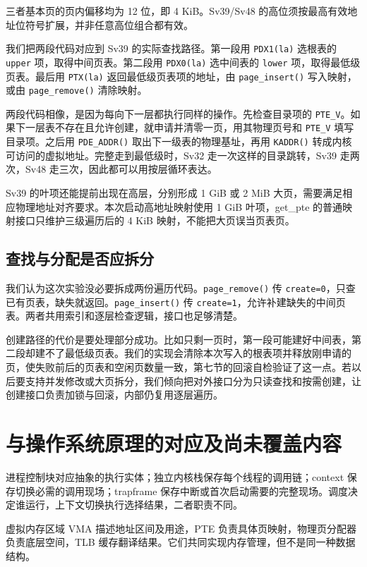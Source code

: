 \documentclass[UTF8,a4paper,10pt]{ctexart}
\begin{document}
三者基本页的页内偏移均为 12 位，即 4 KiB。Sv39/Sv48 的高位须按最高有效地址位符号扩展，并非任意高位组合都有效。


我们把两段代码对应到 Sv39 的实际查找路径。第一段用 \nolinkurl{PDX1(la)} 选根表的 \nolinkurl{upper} 项，取得中间页表。第二段用 \nolinkurl{PDX0(la)} 选中间表的 \nolinkurl{lower} 项，取得最低级页表。最后用 \nolinkurl{PTX(la)} 返回最低级页表项的地址，由 \nolinkurl{page_insert()} 写入映射，或由 \nolinkurl{page_remove()} 清除映射。


两段代码相像，是因为每向下一层都执行同样的操作。先检查目录项的 \nolinkurl{PTE_V}。如果下一层表不存在且允许创建，就申请并清零一页，用其物理页号和 \nolinkurl{PTE_V} 填写目录项。之后用 \nolinkurl{PDE_ADDR()} 取出下一级表的物理基址，再用 \nolinkurl{KADDR()} 转成内核可访问的虚拟地址。完整走到最低级时，Sv32 走一次这样的目录跳转，Sv39 走两次，Sv48 走三次，因此都可以用按层循环表达。


Sv39 的叶项还能提前出现在高层，分别形成 1 GiB 或 2 MiB 大页，需要满足相应物理地址对齐要求。本次启动高地址映射使用 1 GiB 叶项，get\_pte 的普通映射接口只维护三级遍历后的 4 KiB 映射，不能把大页误当页表页。


\subsection{查找与分配是否应拆分}

我们认为这次实验没必要拆成两份遍历代码。\nolinkurl{page_remove()} 传 \nolinkurl{create=0}，只查已有页表，缺失就返回。\nolinkurl{page_insert()} 传 \nolinkurl{create=1}，允许补建缺失的中间页表。两者共用索引和逐层检查逻辑，接口也足够清楚。


创建路径的代价是要处理部分成功。比如只剩一页时，第一段可能建好中间表，第二段却建不了最低级页表。我们的实现会清除本次写入的根表项并释放刚申请的页，使失败前后的页表和空闲页数量一致，第七节的回滚自检验证了这一点。若以后要支持并发修改或大页拆分，我们倾向把对外接口分为只读查找和按需创建，让创建接口负责加锁与回滚，内部仍复用逐层遍历。


\section{与操作系统原理的对应及尚未覆盖内容}

进程控制块对应抽象的执行实体；独立内核栈保存每个线程的调用链；context 保存切换必需的调用现场；trapframe 保存中断或首次启动需要的完整现场。调度决定谁运行，上下文切换执行选择结果，二者职责不同。


虚拟内存区域 VMA 描述地址区间及用途，PTE 负责具体页映射，物理页分配器负责底层空间，TLB 缓存翻译结果。它们共同实现内存管理，但不是同一种数据结构。
\end{document}
